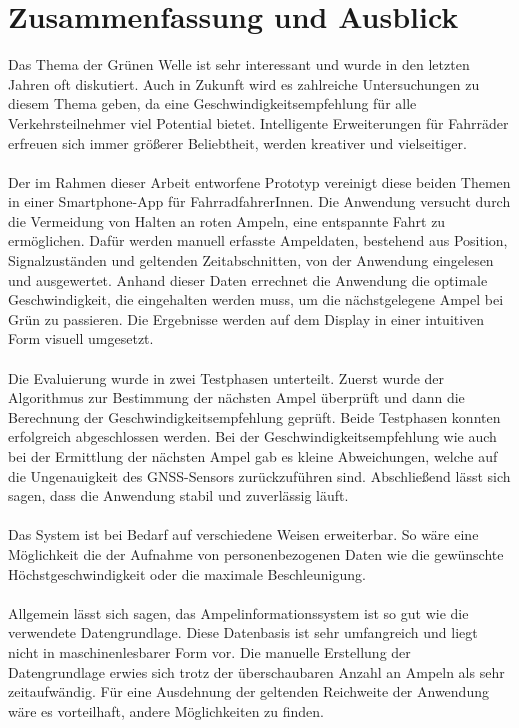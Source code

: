 \chapter{\label{chap:fazit}Zusammenfassung und Ausblick}
Das Thema der Grünen Welle ist sehr interessant und wurde in den letzten Jahren oft diskutiert. Auch in Zukunft wird es zahlreiche Untersuchungen zu diesem Thema geben, da eine Geschwindigkeitsempfehlung für alle Verkehrsteilnehmer viel Potential bietet. Intelligente Erweiterungen für Fahrräder erfreuen sich immer größerer Beliebtheit, werden kreativer und vielseitiger.\\\\
Der im Rahmen dieser Arbeit entworfene Prototyp vereinigt diese beiden Themen in einer \gls{Smartphone}-\gls{App} für FahrradfahrerInnen. Die Anwendung versucht durch die Vermeidung von Halten an roten Ampeln, eine entspannte Fahrt zu ermöglichen. Dafür werden manuell erfasste Ampeldaten, bestehend aus Position, Signalzuständen und geltenden Zeitabschnitten, von der Anwendung eingelesen und ausgewertet. Anhand dieser Daten errechnet die Anwendung die optimale Geschwindigkeit, die eingehalten werden muss, um die nächstgelegene Ampel bei Grün zu passieren. Die Ergebnisse werden auf dem Display in einer intuitiven Form visuell umgesetzt.\\\\ 
Die Evaluierung wurde in zwei Testphasen unterteilt. Zuerst wurde der Algorithmus zur Bestimmung der nächsten Ampel überprüft und dann die Berechnung der Geschwindigkeitsempfehlung geprüft. Beide Testphasen konnten erfolgreich abgeschlossen werden. Bei der Geschwindigkeitsempfehlung wie auch bei der Ermittlung der nächsten Ampel gab es kleine Abweichungen, welche auf die Ungenauigkeit des \gls{GNSS}-Sensors zurückzuführen sind. Abschließend lässt sich sagen, dass die Anwendung stabil und zuverlässig läuft.\\\\
%
%
Das System ist bei Bedarf auf verschiedene Weisen erweiterbar. So wäre eine Möglichkeit die der Aufnahme von personenbezogenen Daten wie die gewünschte Höchstgeschwindigkeit oder die maximale Beschleunigung.\\\\
Allgemein lässt sich sagen, das Ampelinformationssystem ist so gut wie die verwendete Datengrundlage. Diese Datenbasis ist sehr umfangreich und liegt nicht in maschinenlesbarer Form vor.
Die manuelle Erstellung der Datengrundlage erwies sich trotz der überschaubaren Anzahl an Ampeln als sehr zeitaufwändig. Für eine Ausdehnung der geltenden Reichweite der Anwendung wäre es vorteilhaft, andere Möglichkeiten zu finden.\\ 
